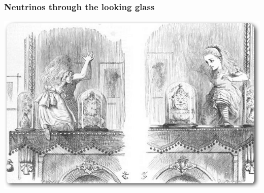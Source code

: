 \begin{frame}
\frametitle{Neutrinos through the looking glass}

\includegraphics[scale=0.4]{img/Alice.png}

\end{frame}


